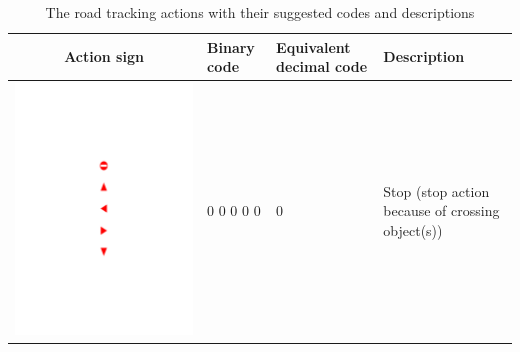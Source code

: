 \begin{table}[!h]
	\centering
	\caption{The road tracking actions with their suggested codes and descriptions}
	\label{Table:Signs_codes}
	\begin{tabular}{|c|C{2cm}|C{2cm}|C{5cm}|}
		\hline
		\textbf{Action sign} & \textbf{Binary code} & \textbf{Equivalent decimal code} & \textbf{Description} \\ \hline
		\begin{minipage}{.075\textwidth}\includegraphics[scale=.5,trim=9.1cm 18.5cm 9.5cm 8cm,clip]{signs.pdf}\end{minipage}	& 0 0 0 0 0 & 0 & Stop (stop action because of crossing object(s)) \\ \hline

\end{tabular}
\end{table}
